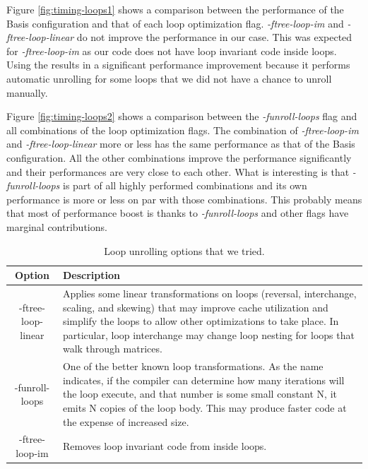 \documentclass{article}
\begin{document}
Figure \ref{fig:timing-loops1} shows a comparison between the performance of the Basis configuration and that of each loop optimization flag. \textit{-ftree-loop-im} and \textit{-ftree-loop-linear} do not improve the performance in our case. This was expected for  \textit{-ftree-loop-im} as our code does not have loop invariant code inside loops. Using the  results in a significant performance improvement because it performs automatic unrolling for some loops that we did not have a chance to unroll manually. 

Figure \ref{fig:timing-loops2} shows a comparison between the \textit{-funroll-loops} flag and all combinations of the loop optimization flags. The combination of \textit{-ftree-loop-im} and \textit{-ftree-loop-linear} more or less has the same performance as that of the Basis configuration. All the other combinations improve the performance significantly and their performances are very close to each other. What is interesting is that \textit{-funroll-loops} is part of all highly performed combinations and its own performance is more or less on par with those combinations. This probably means that most of performance boost is thanks to \textit{-funroll-loops} and other flags have marginal contributions.


\begin{table}
\begin{center}
    \begin{tabular}{ | c | p{10cm} |}
    \hline
    Option & Description \\ \hline
    -ftree-loop-linear  & Applies some linear transformations on loops (reversal, interchange, scaling, and skewing) that may improve cache utilization and simplify the loops to allow other optimizations to take place. In particular, loop interchange may change loop nesting for loops that walk through matrices. \\ \hline
    -funroll-loops &  One of the better known loop transformations. As the name indicates, if the compiler can determine how many iterations will the loop execute, and that number is some small constant N, it emits N copies of the loop body. This may produce faster code at the expense of increased size. \\
    \hline
    -ftree-loop-im & Removes loop invariant code from inside loops. \\ \hline
    \end{tabular}
    \caption{Loop unrolling options that we tried.}
    \label{loop-unrolling}
\end{center}
\end{table}
\end{document}
